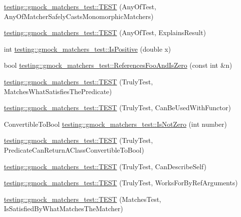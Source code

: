 \begin{DoxyCompactItemize}
\item 
\hyperlink{namespacetesting_1_1gmock__matchers__test_a8fb1598253450afeb0440682cd23999e}{testing\+::gmock\+\_\+matchers\+\_\+test\+::\+T\+E\+ST} (Any\+Of\+Test, Any\+Of\+Matcher\+Safely\+Casts\+Monomorphic\+Matchers)
\item 
\hyperlink{namespacetesting_1_1gmock__matchers__test_ad4c09014fce6029575e2c337cde85bdf}{testing\+::gmock\+\_\+matchers\+\_\+test\+::\+T\+E\+ST} (Any\+Of\+Test, Explains\+Result)
\item 
int \hyperlink{namespacetesting_1_1gmock__matchers__test_a70e728cf67d0224c3ebb9eb8959cc39d}{testing\+::gmock\+\_\+matchers\+\_\+test\+::\+Is\+Positive} (double x)
\item 
bool \hyperlink{namespacetesting_1_1gmock__matchers__test_abdce9daf2e3d3721d68f76680129f03b}{testing\+::gmock\+\_\+matchers\+\_\+test\+::\+References\+Foo\+And\+Is\+Zero} (const int \&n)
\item 
\hyperlink{namespacetesting_1_1gmock__matchers__test_ab7761562a8ffea67a485f3f649f6430a}{testing\+::gmock\+\_\+matchers\+\_\+test\+::\+T\+E\+ST} (Truly\+Test, Matches\+What\+Satisfies\+The\+Predicate)
\item 
\hyperlink{namespacetesting_1_1gmock__matchers__test_ab3e259f3ae45e199474d7c6d554852f0}{testing\+::gmock\+\_\+matchers\+\_\+test\+::\+T\+E\+ST} (Truly\+Test, Can\+Be\+Used\+With\+Functor)
\item 
Convertible\+To\+Bool \hyperlink{namespacetesting_1_1gmock__matchers__test_a248045bc57c8bad87b7d185b5c292f60}{testing\+::gmock\+\_\+matchers\+\_\+test\+::\+Is\+Not\+Zero} (int number)
\item 
\hyperlink{namespacetesting_1_1gmock__matchers__test_a24529fd7834d272009af74106422fe54}{testing\+::gmock\+\_\+matchers\+\_\+test\+::\+T\+E\+ST} (Truly\+Test, Predicate\+Can\+Return\+A\+Class\+Convertible\+To\+Bool)
\item 
\hyperlink{namespacetesting_1_1gmock__matchers__test_af474a9719e614d521c71bdf7c39f6a7a}{testing\+::gmock\+\_\+matchers\+\_\+test\+::\+T\+E\+ST} (Truly\+Test, Can\+Describe\+Self)
\item 
\hyperlink{namespacetesting_1_1gmock__matchers__test_ae702d436c52bd37fe3e8d405d7e6a691}{testing\+::gmock\+\_\+matchers\+\_\+test\+::\+T\+E\+ST} (Truly\+Test, Works\+For\+By\+Ref\+Arguments)
\item 
\hyperlink{namespacetesting_1_1gmock__matchers__test_a6617484cbb644af9882fc5d853112aae}{testing\+::gmock\+\_\+matchers\+\_\+test\+::\+T\+E\+ST} (Matches\+Test, Is\+Satisfied\+By\+What\+Matches\+The\+Matcher)

\end{DoxyCompactItemize}
